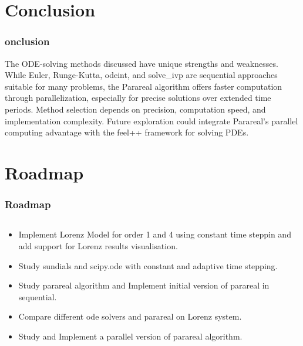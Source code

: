 \documentclass[
	11pt,
]{beamer}
\begin{document}
\section{Conclusion}

\begin{frame}
	\frametitle{ onclusion}
	The ODE-solving methods discussed have unique strengths and weaknesses. While Euler, Runge-Kutta, odeint, and solve_ivp are sequential approaches suitable for many problems, the Parareal algorithm offers faster computation through parallelization, especially for precise solutions over extended time periods. Method selection depends on precision, computation speed, and implementation complexity. Future exploration could integrate Parareal's parallel computing advantage with the feel++ framework for solving PDEs.


\end{frame}



\section{Roadmap}
\begin{frame}
	\frametitle{Roadmap}
	\begin{columns}[c]
		\begin{column}{\textwidth}
			\begin{itemize}
				\item Implement Lorenz Model for order 1 and 4 using constant time steppin and add support for Lorenz results visualisation.
				\item Study sundials and scipy.ode with constant and adaptive time stepping.
				\item Study parareal algorithm and Implement initial version of parareal in sequential.
				\item Compare different ode solvers and parareal on Lorenz system.
				\item Study and Implement a parallel version of parareal algorithm.
			\end{itemize}
		\end{column}
	\end{columns}
\end{frame}
\end{document}
